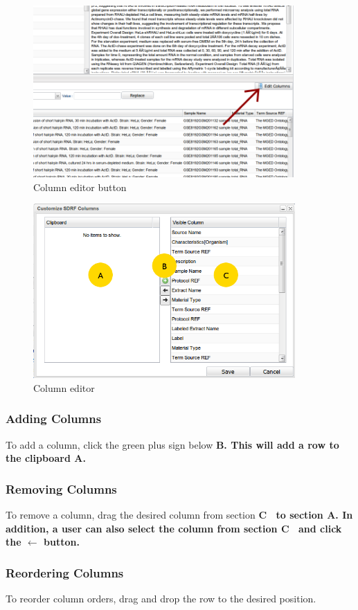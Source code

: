 \documentclass[a4paper]{article}
\begin{document}
\begin{figure}[h]
\caption{Column editor button}
\centering
\label{columneditbutton}
\includegraphics[width=10cm]{images/ColumnEditor}
\end{figure}

\begin{figure}[h]
\caption{Column editor}
\centering
\label{columneditor}
\includegraphics[width=10cm]{images/ceditor}
\end{figure}
\newpage
\subsubsection{Adding Columns}
To add a column, click the green plus sign below \bf{B}\rm. This will add a row to the clipboard \bf{A}\rm.
\subsubsection{Removing Columns}
To remove a column, drag the desired column from section \bf{C}\rm~ to section \bf{A}\rm. In addition, a user can also select the column from section \bf{C}\rm~ and click the $\leftarrow$ button.
\subsubsection{Reordering Columns}
To reorder column orders, drag and drop the row to the desired position.
\end{document}
